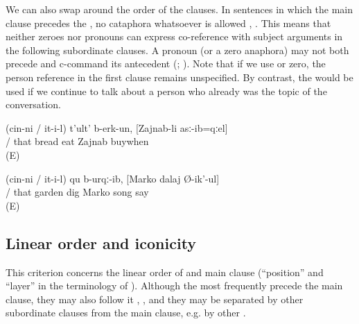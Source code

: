 We can also swap around the order of the clauses. In sentences in which the main clause precedes the , no cataphora whatsoever is allowed , . This means that neither zeroes nor pronouns can express co-reference with subject arguments in the following subordinate clauses. A pronoun (or a zero anaphora) may not both precede and c-command its antecedent (\citealp[185]{Langacker1969}; \citealp[8]{Reinhart1976}). Note that if we use  or zero, the person reference in the first clause remains unspecified. By contrast, the  would be used if we continue to talk about a person who already was the topic of the conversation.
%
\begin{exe}
	\ex	\label{ex:S/he ate the bread when Zainab bought it}
	\gll	(cin-ni	/	it-i-l)	t'ult'	b-erk-un,	[Zajnab-li	asː-ib=qːel]\\
			/	that	bread	eat	Zajnab	buywhen\\
	\glt	{} (E)

	\ex	\label{ex:While Zapir was singing a song}
	\gll	(cin-ni	/	it-i-l)	qu	b-urqː-ib, 	[Marko	dalaj	Ø-ik'-ul]\\
			/	that	garden	dig	Marko	song	say\\
	\glt	{} (E)
\end{exe}



\subsection{Linear order and iconicity}
\label{ssec:Linear order and iconicity}

This criterion concerns the linear order of  and main clause (``position'' and ``layer'' in the terminology of \citealp{Bickel2010}). Although the  most frequently precede the main clause, they may also follow it , , and they may be separated by other subordinate clauses from the main clause, e.g. by other .

